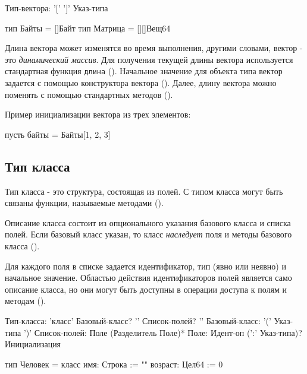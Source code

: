 \begin{Grammar}
Тип-вектора: '[' ']'  Указ-типа
\end{Grammar} 

\begin{Trivil}
тип Байты = []Байт
тип Матрица = [][]Вещ64
\end{Trivil}

Длина вектора может изменятся во время выполнения, другими словами, вектор - это \emph{динамический массив}. Для получения текущей длины вектора используется стандартная функция \verb|длина| ().
Начальное значение для объекта типа вектор задается с помощью конструктора вектора (). Далее, длину вектора можно поменять с помощью стандартных методов ().

Пример инициализации вектора из трех элементов:
\begin{Trivil}[vspace=2pt]
пусть байты = Байты[1, 2, 3]
\end{Trivil}

\hypertarget{class-types}{%
\subsection{Тип класса}\label{decls:class-types}}

Тип класса - это структура, состоящая из полей. С типом класса могут быть связаны функции, называемые методами ().

Описание класса состоит из опционального указания базового класса и списка полей. 
Если базовый класс указан, то класс \emph{наследует} поля и методы базового класса ().

Для каждого поля в списке задается идентификатор, тип (явно или неявно) и начальное значение.
Областью действия идентификаторов полей является само описание класса, но они могут быть доступны в операции доступа к полям и методам ().

\begin{Grammar}
Тип-класса:  'класс' Базовый-класс? '{' Список-полей? '}'
Базовый-класс: '(' Указ-типа ')'
Список-полей: Поле (Разделитель Поле)*
Поле: Идент-оп (':' Указ-типа)? Инициализация
\end{Grammar} 

\begin{Trivil}
тип Человек = класс {
    имя: Строка := ""
    возраст: Цел64 := 0
}
\end{Trivil}

